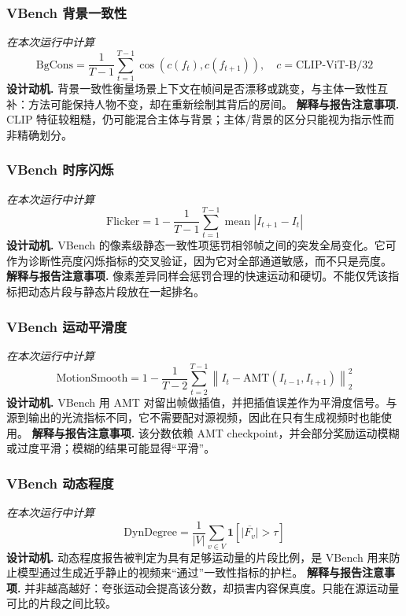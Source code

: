 \documentclass[UTF8,10pt]{ctexart}
\begin{document}
\subsubsection*{VBench 背景一致性}
\textit{在本次运行中计算}
\begin{equation*}
\mathrm{BgCons}=\frac{1}{T-1}\sum_{t=1}^{T-1}\cos\!\left(c(f_t),c(f_{t+1})\right),\quad c=\mathrm{CLIP\text{-}ViT\text{-}B/32}
\end{equation*}
\textbf{设计动机.} 背景一致性衡量场景上下文在帧间是否漂移或跳变，与主体一致性互补：方法可能保持人物不变，却在重新绘制其背后的房间。
\textbf{解释与报告注意事项.} CLIP 特征较粗糙，仍可能混合主体与背景；主体/背景的区分只能视为指示性而非精确划分。
\subsubsection*{VBench 时序闪烁}
\textit{在本次运行中计算}
\begin{equation*}
\mathrm{Flicker}=1-\frac{1}{T-1}\sum_{t=1}^{T-1}\operatorname{mean}\left|I_{t+1}-I_t\right|
\end{equation*}
\textbf{设计动机.} VBench 的像素级静态一致性项惩罚相邻帧之间的突发全局变化。它可作为诊断性亮度闪烁指标的交叉验证，因为它对全部通道敏感，而不只是亮度。
\textbf{解释与报告注意事项.} 像素差异同样会惩罚合理的快速运动和硬切。不能仅凭该指标把动态片段与静态片段放在一起排名。
\subsubsection*{VBench 运动平滑度}
\textit{在本次运行中计算}
\begin{equation*}
\mathrm{MotionSmooth}=1-\frac{1}{T-2}\sum_{t=2}^{T-1}\left\|I_t-\mathrm{AMT}(I_{t-1},I_{t+1})\right\|_2^2
\end{equation*}
\textbf{设计动机.} VBench 用 AMT 对留出帧做插值，并把插值误差作为平滑度信号。与源到输出的光流指标不同，它不需要配对源视频，因此在只有生成视频时也能使用。
\textbf{解释与报告注意事项.} 该分数依赖 AMT checkpoint，并会部分奖励运动模糊或过度平滑；模糊的结果可能显得“平滑”。
\subsubsection*{VBench 动态程度}
\textit{在本次运行中计算}
\begin{equation*}
\mathrm{DynDegree}=\frac{1}{|V|}\sum_{v\in V}\mathbf{1}\!\left[\overline{\left|F_v\right|}>\tau\right]
\end{equation*}
\textbf{设计动机.} 动态程度报告被判定为具有足够运动量的片段比例，是 VBench 用来防止模型通过生成近乎静止的视频来“通过”一致性指标的护栏。
\textbf{解释与报告注意事项.} 并非越高越好：夸张运动会提高该分数，却损害内容保真度。只能在源运动量可比的片段之间比较。
\end{document}
